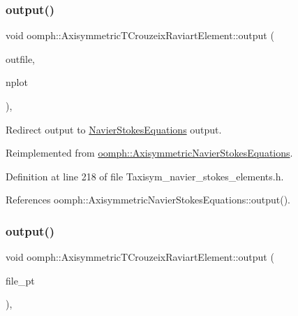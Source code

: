 \subsubsection{\texorpdfstring{output()}{output()}\hspace{0.1cm}{\footnotesize\ttfamily [2/4]}}
{\footnotesize\ttfamily void oomph\+::\+Axisymmetric\+T\+Crouzeix\+Raviart\+Element\+::output (\begin{DoxyParamCaption}\item[{std\+::ostream \&}]{outfile,  }\item[{const unsigned \&}]{nplot }\end{DoxyParamCaption})\hspace{0.3cm}{\ttfamily [inline]}, {\ttfamily [virtual]}}



Redirect output to \hyperlink{classoomph_1_1NavierStokesEquations}{Navier\+Stokes\+Equations} output. 



Reimplemented from \hyperlink{classoomph_1_1AxisymmetricNavierStokesEquations_a94a243ca05ba3b995e366564e6cf7695}{oomph\+::\+Axisymmetric\+Navier\+Stokes\+Equations}.



Definition at line 218 of file Taxisym\+\_\+navier\+\_\+stokes\+\_\+elements.\+h.



References oomph\+::\+Axisymmetric\+Navier\+Stokes\+Equations\+::output().

\mbox{\label{classoomph_1_1AxisymmetricTCrouzeixRaviartElement_ad5cb068224ac067b234de78e67866bb6}} 
\subsubsection{\texorpdfstring{output()}{output()}\hspace{0.1cm}{\footnotesize\ttfamily [3/4]}}
{\footnotesize\ttfamily void oomph\+::\+Axisymmetric\+T\+Crouzeix\+Raviart\+Element\+::output (\begin{DoxyParamCaption}\item[{F\+I\+LE $\ast$}]{file\+\_\+pt }\end{DoxyParamCaption})\hspace{0.3cm}{\ttfamily [inline]}, {\ttfamily [virtual]}}



